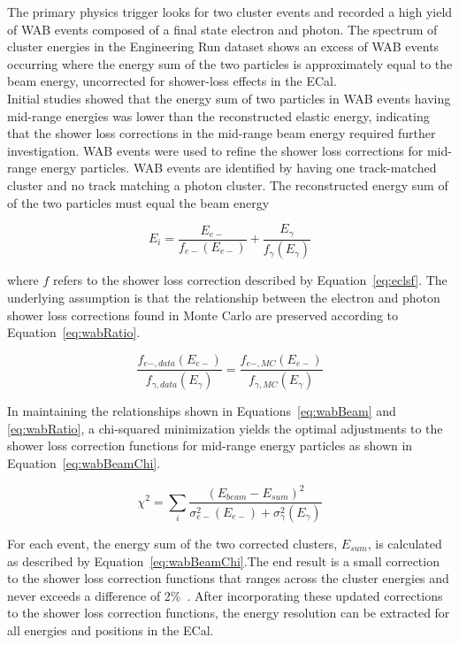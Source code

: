The primary physics trigger looks for two cluster events and recorded a high yield of WAB events composed of a final state electron and photon. The spectrum of cluster energies in the Engineering Run dataset shows an excess of WAB events occurring where the energy sum of the two particles is approximately equal to the beam energy, uncorrected for shower-loss effects in the ECal.  \\
\indent Initial studies showed that the energy sum of two particles in WAB events having mid-range energies was lower than the reconstructed elastic energy, indicating that the shower loss corrections in the mid-range beam energy required further investigation. WAB events were used to refine the shower loss corrections for mid-range energy particles. WAB events are identified by having one track-matched cluster and no track matching a photon cluster. The reconstructed energy sum of of the two particles must equal the beam energy~\cite{szumila-vance_hps_2016}

\begin{equation}
	\label{eq:wabBeam}
	E_i = \dfrac{E_{e-}}{f_{e-}(E_{e-})}+\dfrac{E_{\gamma}}{f_{\gamma}(E_{\gamma})}
\end{equation}

where $f$ refers to the shower loss correction described by Equation~\eqref{eq:eclsf}. The underlying assumption is that the relationship between the electron and photon shower loss corrections found in Monte Carlo are preserved according to Equation~\eqref{eq:wabRatio}.

\begin{equation}
	\label{eq:wabRatio}
	 \dfrac{f_{e-, data}(E_{e-})}{f_{\gamma, data}(E_{\gamma})}= \dfrac{f_{e-, MC}(E_{e-})}{f_{\gamma, MC}(E_{\gamma})}
\end{equation}

In maintaining the relationships shown in Equations~\eqref{eq:wabBeam} and \eqref{eq:wabRatio}, a chi-squared minimization yields the optimal adjustments to the shower loss correction functions for mid-range energy particles as shown in Equation~\eqref{eq:wabBeamChi}.

\begin{equation}
	\label{eq:wabBeamChi}
	\chi^2 =\sum_{i} \dfrac{(E_{beam}-E_{sum})^2}{\sigma_{e-}^2(E_{e-})+\sigma_{\gamma}^2(E_{\gamma})}	
\end{equation}

For each event, the energy sum of the two corrected clusters, $E_{sum}$, is calculated as described by Equation~\eqref{eq:wabBeamChi}.The end result is a small correction to the shower loss correction functions that ranges across the cluster energies and never exceeds a difference of 2$\%$~\cite{szumila-vance_hps_2016}. After incorporating these updated corrections to the shower loss correction functions, the energy resolution can be extracted for all energies and positions in the ECal.  
